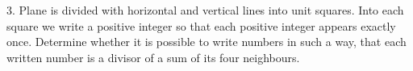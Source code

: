 3. Plane is divided with horizontal and vertical lines into unit squares. Into each square we write a positive integer so that each positive integer appears exactly once. Determine whether it is possible to write numbers in such a way, that each written number is a divisor of a sum of its four neighbours.